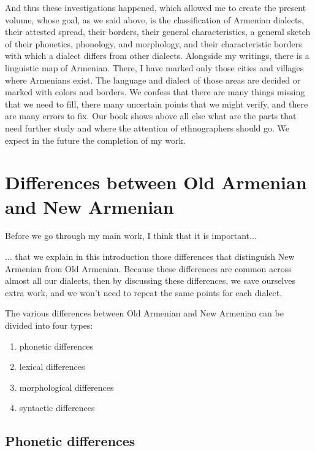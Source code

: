 And thus these investigations happened, which allowed me to create the present volume, whose goal, as we said above, is the classification of Armenian dialects, their attested spread, their borders, their general characteristics, a general sketch of their phonetics, phonology, and morphology, and their characteristic borders with which a dialect differs from other dialects. Alongside my writings, there is a linguistic map of Armenian. There, I have marked only those cities and villages where Armenians exist. The language and dialect of those areas are decided or marked with colors and borders. We confess that there are many things missing that we need to fill, there many uncertain points that we might verify, and there are many errors to fix. Our book shows above all else what are the parts that need further study and where the attention of ethnographers should go. We expect in the future the completion of my work. 


\section{Differences between Old Armenian and New Armenian}

Before we go through my main work, I think that it is important... 



\begin{adjarianpage}\label{page:15}\end{adjarianpage}%

... that we explain in this introduction those differences that distinguish New Armenian from Old Armenian. Because these differences are common across almost all our dialects, then by discussing these differences, we save ourselves     extra work, and we won't need to repeat the same points for each dialect. 


The various differences between Old Armenian and New Armenian can be divided into four types: 
\begin{enumerate}
	\item phonetic differences
	\item lexical differences 
	\item morphological differences
	\item syntactic differences
\end{enumerate}


\subsection{Phonetic differences}\label{sec:IntroAdjarian:Differences:Phonetic}


